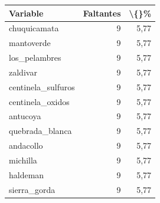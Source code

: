 \begin{tabular}{lrr}
\toprule
Variable & Faltantes & \textbackslash\{\}\% \\
\midrule
chuquicamata & 9 & 5,77 \\
mantoverde & 9 & 5,77 \\
los\_pelambres & 9 & 5,77 \\
zaldivar & 9 & 5,77 \\
centinela\_sulfuros & 9 & 5,77 \\
centinela\_oxidos & 9 & 5,77 \\
antucoya & 9 & 5,77 \\
quebrada\_blanca & 9 & 5,77 \\
andacollo & 9 & 5,77 \\
michilla & 9 & 5,77 \\
haldeman & 9 & 5,77 \\
sierra\_gorda & 9 & 5,77 \\
\bottomrule
\end{tabular}
